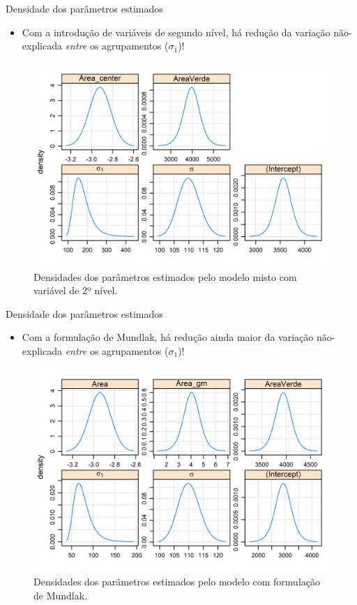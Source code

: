 \documentclass[9pt,ignorenonframetext,aspectratio=169]{beamer}
\providecommand{\tightlist}{%
  \setlength{\itemsep}{0pt}\setlength{\parskip}{0pt}}
\begin{document}
\begin{frame}{Densidade dos parâmetros estimados}
\protect\hypertarget{densidade-dos-paruxe2metros-estimados-1}{}

\begin{itemize}[<+->]
\tightlist
\item
  Com a introdução de variáveis de segundo nível, há redução da variação
  não-explicada \emph{entre} os agrupamentos (\(\sigma_1\))!
\end{itemize}

\begin{figure}

{\centering \includegraphics[width=0.5\linewidth]{../../images/pr1-1} 

}

\caption{Densidades dos parâmetros estimados pelo modelo misto com variável de 2º nível.}\label{fig:unnamed-chunk-14}
\end{figure}

\end{frame}

\begin{frame}{Densidade dos parâmetros estimados}
\protect\hypertarget{densidade-dos-paruxe2metros-estimados-2}{}

\begin{itemize}[<+->]
\tightlist
\item
  Com a formulação de Mundlak, há redução ainda maior da variação
  não-explicada \emph{entre} os agrupamentos (\(\sigma_1\))!
\end{itemize}

\begin{figure}

{\centering \includegraphics[width=0.5\linewidth]{../../images/pr2-1} 

}

\caption{Densidades dos parâmetros estimados pelo modelo com formulação de Mundlak.}\label{fig:unnamed-chunk-15}
\end{figure}

\end{frame}
\end{document}
